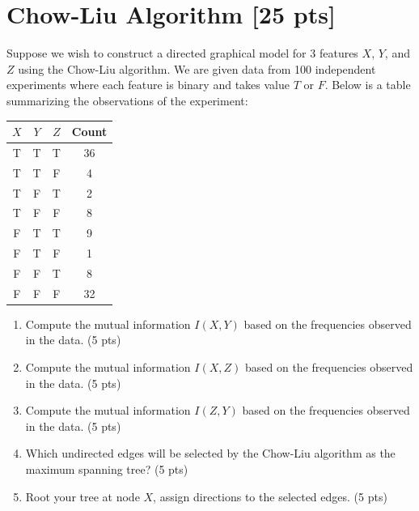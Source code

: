 \documentclass[a4paper]{article}
\theoremstyle{definition}
\begin{document}
\section{Chow-Liu Algorithm [25 pts]}
Suppose we wish to construct a directed graphical model for 3 features $X$, $Y$, and $Z$ using the Chow-Liu algorithm. We are given data from 100 independent experiments where each feature is binary and takes value $T$ or $F$. Below is a table summarizing the observations of the experiment:

\begin{table}[H]
        \centering
                \begin{tabular}{cccc}
                           $X$ & $Y$ & $Z$ & Count \\
                                \hline
                                T & T & T & 36 \\
                                \hline
                                T & T & F & 4 \\
                                \hline
                                T & F & T & 2 \\
                                \hline
                                T & F & F & 8 \\
                                \hline
                                F & T & T & 9 \\
                                \hline
                                F & T & F & 1 \\
                                \hline
                                F & F & T & 8 \\
                                \hline
                                F & F & F & 32 \\
                                \hline
                \end{tabular}
\end{table}

\begin{enumerate}
	\item Compute the mutual information $I(X, Y)$ based on the frequencies observed in the data. (5 pts)
	\item Compute the mutual information $I(X, Z)$ based on the frequencies observed in the data. (5 pts)
	\item Compute the mutual information $I(Z, Y)$ based on the frequencies observed in the data. (5 pts)
	\item Which undirected edges will be selected by the Chow-Liu algorithm as the maximum spanning tree? (5 pts)
	\item Root your tree at node $X$, assign directions to the selected edges. (5 pts)
\end{enumerate}

	
	
\end{document}
